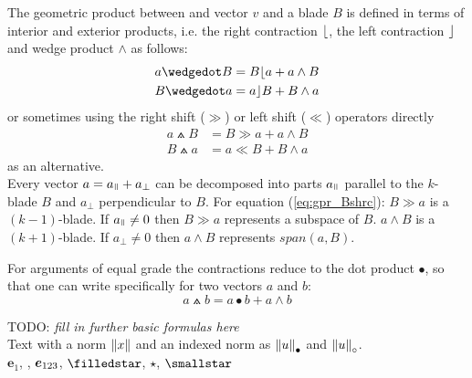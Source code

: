 The geometric product between and vector $v$ and a blade $B$ is defined in terms of
interior and exterior products, i.e. the right contraction $\lfloor$, the left contraction
$\rfloor$ and wedge product $\wedge$ as follows:
\begin{subequations}
    \begin{align}
    a \wedgedot B & =  B \rcontr a + a \wedge B
    \label{eq:gpr_Brc} \\
    B \wedgedot a & =  a \lcontr B + B \wedge a
    \label{eq:gpr_Blc}
    \end{align}
\end{subequations}
or sometimes using the right shift ($\gg$) or left shift ($\ll$) operators directly
\begin{subequations}
    \begin{align}
    a \wedgedot B & = B \gg a + a \wedge B
    \label{eq:gpr_Bshrc} \\
    B \wedgedot a & =  a \ll B + B \wedge a
    \label{eq:gpr_Bshlc}
    \end{align}
\end{subequations}
as an alternative. \\

Every vector $a = a_{\parall} + a_{\perp}$ can be decomposed into parts
$a_{\parall}$ parallel to the $k$-blade $B$ and $a_{\perp}$ perpendicular to $B$. For
equation {(\ref{eq:gpr_Bshrc})}: $B \gg a$ is a $(k-1)$-blade. If $a_{\parall} \neq 0$
then $B \gg a$ represents a subspace of $B$. $a \wedge B$ is a $(k+1)$-blade. If
$a_{\perp} \neq 0$ then $a \wedge B$ represents $span(a,B)$.

For arguments of equal grade the contractions reduce to the dot
product $\bullet$, so that one can write specifically for two vectors $a$ and $b$:
\begin{equation}
    a \wedgedot b =  a \bullet b + a \wedge b
\end{equation}

TODO: \emph{fill in further basic formulas here} \\

Text with a norm $\left \lVert {x} \right \rVert$ and an indexed norm as ${\left \lVert {u} \right \rVert}_\bullet$ and
${\left \lVert {u} \right \rVert}_\circ$.\\

$\bm{e}_1$, , $\bm{e}_{123}$, $\filledstar$, $\star$, $\smallstar$
\\




\newpage